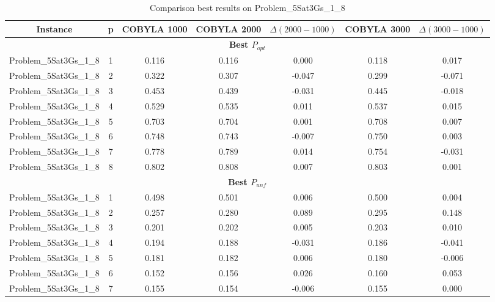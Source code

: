 \begin{table}[!htbp]
    \renewcommand{\arraystretch}{0.7}
    \scriptsize
    \centering
    \caption{Comparison best results on Problem\_5Sat3Gs\_1\_8}
    \begin{adjustbox}{max width=\columnwidth}
        \begin{tabularx}{\columnwidth}{c|c c c c c c}
            \toprule
            \textbf{Instance} & \textbf{p} & \textbf{COBYLA 1000} & \textbf{COBYLA 2000} & $\Delta(2000-1000)$ & \textbf{COBYLA 3000} & $\Delta(3000-1000)$ \\
            \midrule
            \multicolumn{7}{c}{\textbf{Best $P_{opt}$}} \\ \midrule
            Problem\_5Sat3Gs\_1\_8 & 1 & 0.116 & 0.116 & 0.000 & 0.118 & 0.017 \\
            Problem\_5Sat3Gs\_1\_8 & 2 & 0.322 & 0.307 & -0.047 & 0.299 & -0.071 \\
            Problem\_5Sat3Gs\_1\_8 & 3 & 0.453 & 0.439 & -0.031 & 0.445 & -0.018 \\
            Problem\_5Sat3Gs\_1\_8 & 4 & 0.529 & 0.535 & 0.011 & 0.537 & 0.015 \\
            Problem\_5Sat3Gs\_1\_8 & 5 & 0.703 & 0.704 & 0.001 & 0.708 & 0.007 \\
            Problem\_5Sat3Gs\_1\_8 & 6 & 0.748 & 0.743 & -0.007 & 0.750 & 0.003 \\
            Problem\_5Sat3Gs\_1\_8 & 7 & 0.778 & 0.789 & 0.014 & 0.754 & -0.031 \\
            Problem\_5Sat3Gs\_1\_8 & 8 & 0.802 & 0.808 & 0.007 & 0.803 & 0.001 \\
            \multicolumn{7}{c}{\textbf{Best $P_{unf}$}} \\ \midrule
            Problem\_5Sat3Gs\_1\_8 & 1 & 0.498 & 0.501 & 0.006 & 0.500 & 0.004 \\
            Problem\_5Sat3Gs\_1\_8 & 2 & 0.257 & 0.280 & 0.089 & 0.295 & 0.148 \\
            Problem\_5Sat3Gs\_1\_8 & 3 & 0.201 & 0.202 & 0.005 & 0.203 & 0.010 \\
            Problem\_5Sat3Gs\_1\_8 & 4 & 0.194 & 0.188 & -0.031 & 0.186 & -0.041 \\
            Problem\_5Sat3Gs\_1\_8 & 5 & 0.181 & 0.182 & 0.006 & 0.180 & -0.006 \\
            Problem\_5Sat3Gs\_1\_8 & 6 & 0.152 & 0.156 & 0.026 & 0.160 & 0.053 \\
            Problem\_5Sat3Gs\_1\_8 & 7 & 0.155 & 0.154 & -0.006 & 0.155 & 0.000 \\

\end{tabularx}
\end{adjustbox}
\end{table}
